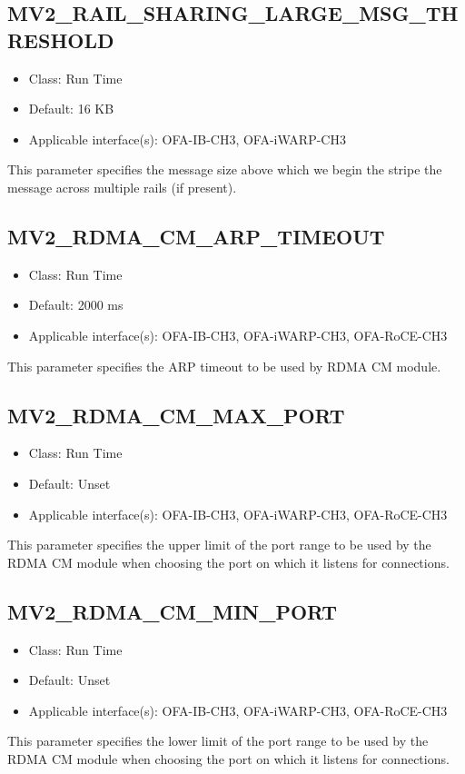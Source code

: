 \subsection{MV2\_RAIL\_SHARING\_LARGE\_MSG\_THRESHOLD}
\label{def:mv2-rail-sharing-large-msg-threshold}
\begin{itemize}
    \item Class: Run Time
    \item Default: 16 KB
    \item Applicable interface(s): OFA-IB-CH3, OFA-iWARP-CH3
\end{itemize}
This parameter specifies the message size above which we begin the stripe
the message across multiple rails (if present).

\subsection{MV2\_RDMA\_CM\_ARP\_TIMEOUT}
\label{def:mv2-rdma-cm-arp-timeout}
\begin{itemize}
    \item Class: Run Time
    \item Default: 2000 ms
    \item Applicable interface(s): OFA-IB-CH3, OFA-iWARP-CH3, OFA-RoCE-CH3
\end{itemize}
This parameter specifies the ARP timeout to be used by RDMA CM module.

\subsection{MV2\_RDMA\_CM\_MAX\_PORT}
\label{def:mv2-rdma-cm-max-port}
\begin{itemize}
    \item Class: Run Time
    \item Default: Unset
    \item Applicable interface(s): OFA-IB-CH3, OFA-iWARP-CH3, OFA-RoCE-CH3
\end{itemize}
This parameter specifies the upper limit of the port range to be used 
by the RDMA CM module when choosing the port on which it listens for 
connections.

\subsection{MV2\_RDMA\_CM\_MIN\_PORT}
\label{def:mv2-rdma-cm-min-port}
\begin{itemize}
    \item Class: Run Time
    \item Default: Unset
    \item Applicable interface(s): OFA-IB-CH3, OFA-iWARP-CH3, OFA-RoCE-CH3
\end{itemize}
This parameter specifies the lower limit of the port range to be used 
by the RDMA CM module when choosing the port on which it listens for 
connections.

